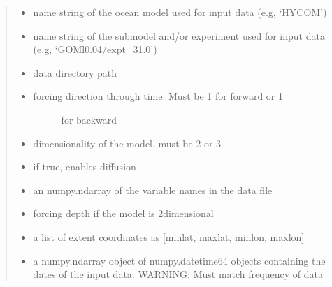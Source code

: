 \documentclass[letterpaper,10pt,english]{sphinxmanual}
\begin{document}
\begin{fulllineitems}
\begin{quote}
\begin{description}
\begin{itemize}
\item {} 
\sphinxAtStartPar
{} \textendash{} name string of the ocean model used for input data (e.g, ‘HYCOM’)

\item {} 
\sphinxAtStartPar
{} \textendash{} name string of the submodel and/or experiment used for input data
(e.g, ‘GOMl0.04/expt\_31.0’)

\item {} 
\sphinxAtStartPar
{} \textendash{} data directory path

\item {} 
\sphinxAtStartPar
{} \textendash{} \begin{description}
\item[{forcing direction through time. Must be  1 for forward or \sphinxhyphen{}1}] \leavevmode
\sphinxAtStartPar
for backward

\end{description}


\item {} 
\sphinxAtStartPar
{} \textendash{} dimensionality of the model, must be 2 or 3

\item {} 
\sphinxAtStartPar
{} \textendash{} if true, enables diffusion

\item {} 
\sphinxAtStartPar
{} \textendash{} an numpy.ndarray of the variable names in the data file

\item {} 
\sphinxAtStartPar
{} \textendash{} forcing depth if the model is 2\sphinxhyphen{}dimensional

\item {} 
\sphinxAtStartPar
{} \textendash{} a list of extent coordinates as {[}minlat, maxlat, minlon, maxlon{]}

\item {} 
\sphinxAtStartPar
{} \textendash{} a numpy.ndarray object of numpy.datetime64 objects containing the dates
of the input data. WARNING: Must match frequency of data


\end{itemize}
\end{description}
\end{quote}
\end{fulllineitems}
\end{document}
